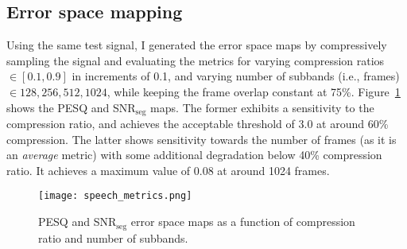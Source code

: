 \subsection{Error space mapping}
\label{ssec:audio-speech-error}
Using the same test signal, I generated the error space maps by compressively sampling the signal and evaluating the metrics for varying compression ratios~$\in [0.1, 0.9]$ in increments of 0.1, and varying number of subbands (i.e., frames)~$\in {128, 256, 512, 1024}$, while keeping the frame overlap constant at 75\%. Figure~\ref{fig:speech-error} shows the PESQ and SNR$_\mathrm{seg}$ maps. The former exhibits a sensitivity to the compression ratio, and achieves the acceptable threshold of 3.0 at around 60\% compression. The latter shows sensitivity towards the number of frames (as it is an \textit{average} metric) with some additional degradation below 40\% compression ratio. It achieves a maximum value of 0.08 at around 1024 frames.

\begin{figure}[htb]
	\centering
	\texttt{[image: speech\_metrics.png]}
	\caption{PESQ and SNR$_\mathrm{seg}$ error space maps as a function of compression ratio and number of subbands.}
	\label{fig:speech-error}
\end{figure}